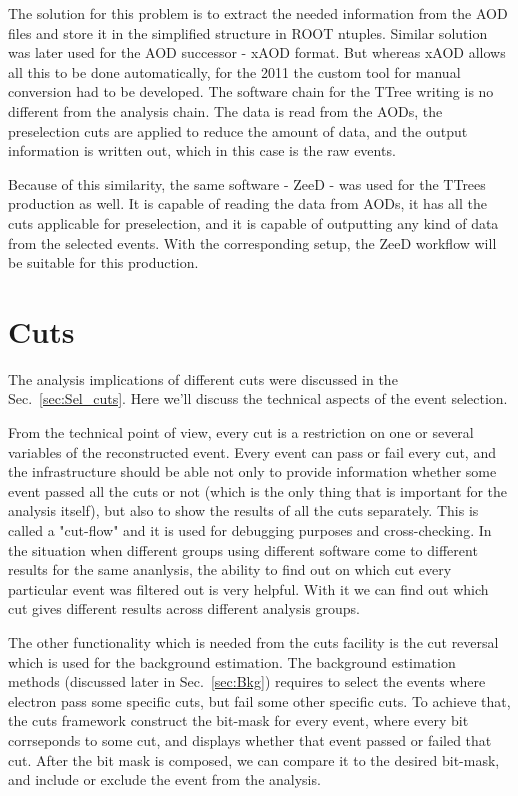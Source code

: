 The solution for this problem is to extract the needed information from the AOD files and store it in the simplified structure in ROOT ntuples. Similar solution was later used for the AOD successor - xAOD format. But whereas xAOD allows all this to be done automatically, for the 2011 the custom tool for manual conversion had to be developed. The software chain for the TTree writing is no different from the analysis chain. The data is read from the AODs, the preselection cuts are applied to reduce the amount of data, and the output information is written out, which in this case is the raw events.

Because of this similarity, the same software - ZeeD - was used for the TTrees production as well. It is capable of reading the data from AODs, it has all the cuts applicable for preselection, and it is capable of outputting any kind of data from the selected events. With the corresponding setup, the ZeeD workflow will be suitable for this production.

\section{Cuts}

The analysis implications of different cuts were discussed in the Sec.~\ref{sec:Sel_cuts}. Here we'll discuss the technical aspects of the event selection.

From the technical point of view, every cut is a restriction on one or several variables of the reconstructed event. Every event can pass or fail every cut, and the infrastructure should be able not only to provide information whether some event passed all the cuts or not (which is the only thing that is important for the analysis itself), but also to show the results of all the cuts separately. This is called a "cut-flow" and it is used for debugging purposes and cross-checking. In the situation when different groups using different software come to different results for the same ananlysis, the ability to find out on which cut every particular event was filtered out is very helpful. With it we can find out which cut gives different results across different analysis groups.

The other functionality which is needed from the cuts facility is the cut reversal which is used for the background estimation. The background estimation methods (discussed later in Sec.~\ref{sec:Bkg}) requires to select the events where electron pass some specific cuts, but fail some other specific cuts. To achieve that, the cuts framework construct the bit-mask for every event, where every bit corrseponds to some cut, and displays whether that event passed or failed that cut. After the bit mask is composed, we can compare it to the desired bit-mask, and include or exclude the event from the analysis.

